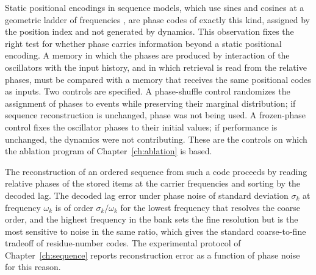 Static positional encodings in sequence models, which use sines and cosines at a geometric ladder of frequencies \cite{vaswani2017}, are phase codes of exactly this kind, assigned by the position index and not generated by dynamics. This observation fixes the right test for whether phase carries information beyond a static positional encoding. A memory in which the phases are produced by interaction of the oscillators with the input history, and in which retrieval is read from the relative phases, must be compared with a memory that receives the same positional codes as inputs. Two controls are specified. A phase-shuffle control randomizes the assignment of phases to events while preserving their marginal distribution; if sequence reconstruction is unchanged, phase was not being used. A frozen-phase control fixes the oscillator phases to their initial values; if performance is unchanged, the dynamics were not contributing. These are the controls on which the ablation program of Chapter~\ref{ch:ablation} is based.

The reconstruction of an ordered sequence from such a code proceeds by reading relative phases of the stored items at the carrier frequencies and sorting by the decoded lag. The decoded lag error under phase noise of standard deviation $\sigma_k$ at frequency $\omega_k$ is of order $\sigma_k/\omega_k$ for the lowest frequency that resolves the coarse order, and the highest frequency in the bank sets the fine resolution but is the most sensitive to noise in the same ratio, which gives the standard coarse-to-fine tradeoff of residue-number codes. The experimental protocol of Chapter~\ref{ch:sequence} reports reconstruction error as a function of phase noise for this reason.
